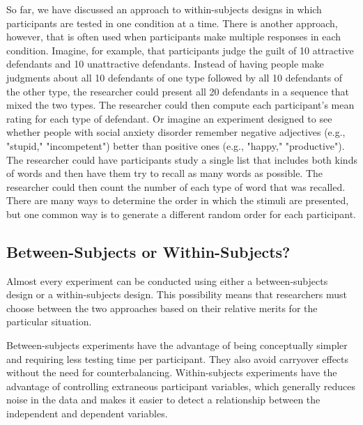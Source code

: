 So far, we have discussed an approach to within-subjects designs in which participants are tested in one condition at a time. There is another approach, however, that is often used when participants make multiple responses in each condition. Imagine, for example, that participants judge the guilt of 10 attractive defendants and 10 unattractive defendants. Instead of having people make judgments about all 10 defendants of one type followed by all 10 defendants of the other type, the researcher could present all 20 defendants in a sequence that mixed the two types. The researcher could then compute each participant's mean rating for each type of defendant. Or imagine an experiment designed to see whether people with social anxiety disorder remember negative adjectives (e.g., "stupid," "incompetent") better than positive ones (e.g., "happy," "productive"). The researcher could have participants study a single list that includes both kinds of words and then have them try to recall as many words as possible. The researcher could then count the number of each type of word that was recalled. There are many ways to determine the order in which the stimuli are presented, but one common way is to generate a different random order for each participant.

\subsection{Between-Subjects or Within-Subjects?}

Almost every experiment can be conducted using either a between-subjects design or a within-subjects design. This possibility means that researchers must choose between the two approaches based on their relative merits for the particular situation.

Between-subjects experiments have the advantage of being conceptually simpler and requiring less testing time per participant. They also avoid carryover effects without the need for counterbalancing. Within-subjects experiments have the advantage of controlling extraneous participant variables, which generally reduces noise in the data and makes it easier to detect a relationship between the independent and dependent variables.

